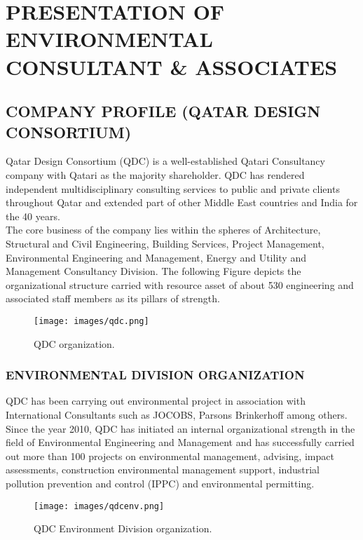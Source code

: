 \chapter{PRESENTATION OF ENVIRONMENTAL CONSULTANT \& ASSOCIATES}

\section{COMPANY PROFILE (QATAR DESIGN CONSORTIUM)}

Qatar Design Consortium (QDC) is a well-established Qatari Consultancy company with Qatari as the majority shareholder. QDC has rendered independent multidisciplinary consulting services to public and private clients throughout Qatar and extended part of other Middle East countries and India for the 40 years. \\

The core business of the company lies within the spheres of Architecture, Structural and Civil Engineering, Building Services, Project Management, Environmental Engineering and Management, Energy and Utility and Management Consultancy Division. The following Figure depicts the organizational structure carried with resource asset of about 530 engineering and associated staff members as its pillars of strength. 

\begin{figure}[H]
\centering
\texttt{[image: images/qdc.png]} 
\caption{QDC organization.}
\label{fig:qdc}
\end{figure}
%

\subsection{ENVIRONMENTAL DIVISION ORGANIZATION}

QDC has been carrying out environmental project in association with International Consultants such as JOCOBS, Parsons Brinkerhoff among others. Since the year 2010, QDC has initiated an internal organizational strength in the field of Environmental Engineering and Management and has successfully carried out more than 100 projects on environmental management, advising, impact assessments, construction environmental management support, industrial pollution prevention and control (IPPC) and environmental permitting.

%
\begin{figure}[H]
\centering
\texttt{[image: images/qdcenv.png]} 
\caption{QDC Environment Division organization.}
\label{fig:qdcenv}
\end{figure}
%

